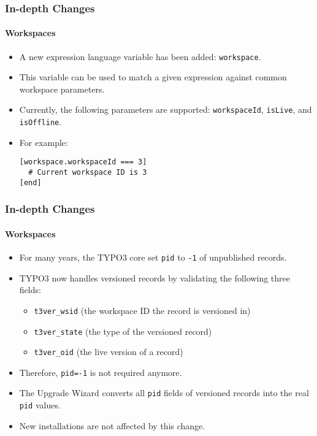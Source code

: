 
\begin{frame}[fragile]
	\frametitle{In-depth Changes}
	\framesubtitle{Workspaces}

	\lstset{basicstyle=\smaller\ttfamily}

	\begin{itemize}
		\item A new expression language variable has been added: \texttt{workspace}.
		\item This variable can be used to match a given expression against common workspace parameters.
		\item Currently, the following parameters are supported:\newline
			\small
				\texttt{workspaceId}, \texttt{isLive}, and \texttt{isOffline}.
			\normalsize
		\item For example:
\begin{lstlisting}
[workspace.workspaceId === 3]
  # Current workspace ID is 3
[end]
\end{lstlisting}

	\end{itemize}

\end{frame}


\begin{frame}[fragile]
	\frametitle{In-depth Changes}
	\framesubtitle{Workspaces}

	\begin{itemize}
		\item For many years, the TYPO3 core set \texttt{pid} to \texttt{-1} of unpublished records.
		\item TYPO3 now handles versioned records by validating the following three fields:

			\begin{itemize}
				\item \texttt{t3ver\_wsid} (the workspace ID the record is versioned in)
				\item \texttt{t3ver\_state} (the type of the versioned record)
				\item \texttt{t3ver\_oid} (the live version of a record)
			\end{itemize}

		\item Therefore, \texttt{pid=-1} is not required anymore.
		\item The Upgrade Wizard converts all \texttt{pid} fields of versioned records
			into the real \texttt{pid} values.
		\item New installations are not affected by this change.

	\end{itemize}

\end{frame}

